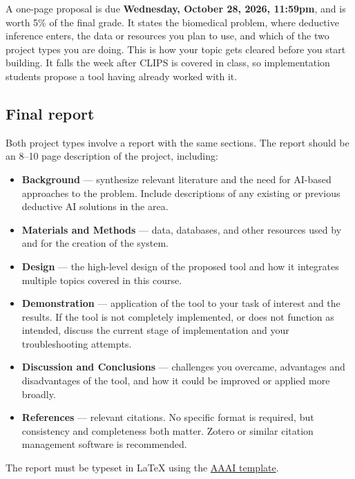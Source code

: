 \documentclass[11pt]{article}
\begin{document}
A one-page proposal is due \textbf{Wednesday, October 28, 2026, 11:59pm}, and is worth 5\% of the final
grade. It states the biomedical problem, where deductive inference enters, the data or resources
you plan to use, and which of the two project types you are doing. This is how your topic gets
cleared before you start building. It falls the week after CLIPS is covered in class, so
implementation students propose a tool having already worked with it.

\subsection{Final report}

Both project types involve a report with the same sections. The report should be an 8--10 page
description of the project, including:

\begin{itemize}
  \item \textbf{Background} --- synthesize relevant literature and the need for AI-based
        approaches to the problem. Include descriptions of any existing or previous deductive AI
        solutions in the area.
  \item \textbf{Materials and Methods} --- data, databases, and other resources used by and for
        the creation of the system.
  \item \textbf{Design} --- the high-level design of the proposed tool and how it integrates
        multiple topics covered in this course.
  \item \textbf{Demonstration} --- application of the tool to your task of interest and the
        results. If the tool is not completely implemented, or does not function as intended,
        discuss the current stage of implementation and your troubleshooting attempts.
  \item \textbf{Discussion and Conclusions} --- challenges you overcame, advantages and
        disadvantages of the tool, and how it could be improved or applied more broadly.
  \item \textbf{References} --- relevant citations. No specific format is required, but
        consistency and completeness both matter. Zotero or similar citation management software
        is recommended.
\end{itemize}

The report must be typeset in \LaTeX{} using the
\href{https://www.overleaf.com/latex/templates/aaai-press-latex-template/jymjdgdpdmxp}{AAAI
template}.
\end{document}
